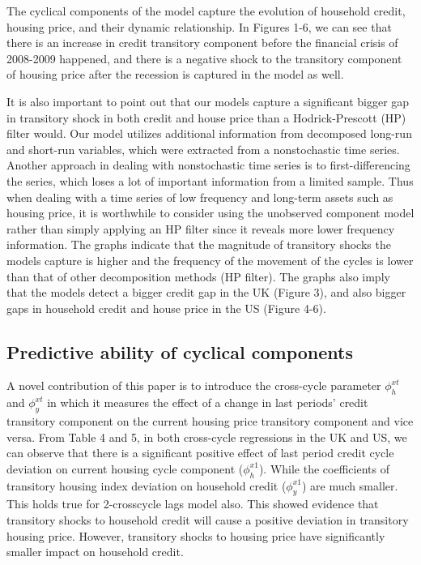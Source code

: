 \documentclass[
  12pt,
]{article}
\begin{document}
        The cyclical components of the model capture the evolution of household credit, housing price, and their dynamic relationship. In Figures 1-6, we can see that there is an increase in credit transitory component before the financial crisis of 2008-2009 happened, and there is a negative shock to the transitory component of housing price after the recession is captured in the model as well.
        
        It is also important to point out that our models capture a significant bigger gap in transitory shock in both credit and house price than a Hodrick-Prescott (HP) filter would. Our model utilizes additional information from decomposed long-run and short-run variables, which were extracted from a nonstochastic time series. Another approach in dealing with nonstochastic time series is to first-differencing the series, which loses a lot of important information from a limited sample. Thus when dealing with a time series of low frequency and long-term assets such as housing price, it is worthwhile to consider using the unobserved component model rather than simply applying an HP filter since it reveals more lower frequency information. The graphs indicate that the magnitude of transitory shocks the models capture is higher and the frequency of the movement of the cycles is lower than that of other decomposition methods (HP filter). The graphs also imply that the models detect a bigger credit gap in the UK (Figure 3), and also bigger gaps in household credit and house price in the US (Figure 4-6).       
        
        
        \subsection{Predictive ability of cyclical components}
        A novel contribution of this paper is to introduce the cross-cycle parameter $\phi^{xt}_h$ and $\phi^{xt}_{y}$ in which it measures the effect of a change in last periods' credit transitory component on the current housing price transitory component and vice versa. From Table 4 and 5, in both cross-cycle regressions in the UK and US, we can observe that there is a significant positive effect of last period credit cycle deviation on current housing cycle component ($\phi^{x1}_{h}$). While the coefficients of transitory housing index deviation on household credit ($\phi^{x1}_{y}$) are much smaller. This holds true for 2-crosscycle lags model also. This showed evidence that transitory shocks to household credit will cause a positive deviation in transitory housing price. However, transitory shocks to housing price have significantly smaller impact on household credit.
        
\end{document}
